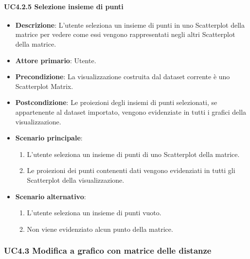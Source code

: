\paragraph{UC4.2.5 Selezione insieme di punti}
\label{par:uc4.2.5}
\begin{itemize}
    \item \textbf{Descrizione}: L'utente seleziona un insieme di punti in uno Scatterplot della matrice per vedere come 
                                essi vengono rappresentati negli altri Scatterplot della matrice.
	
    \item \textbf{Attore primario}: Utente.
    
    \item \textbf{Precondizione}:   La visualizzazione costruita dal dataset corrente è uno Scatterplot Matrix.
    \item \textbf{Postcondizione}:  Le proiezioni degli insiemi di punti selezionati, se appartenente al dataset importato, 
                                    vengono evidenziate in tutti i grafici della visualizzazione.

	\item \textbf{Scenario principale}:
        \begin{enumerate}
            \item L'utente seleziona un insieme di punti di uno Scatterplot della matrice.
            \item Le proiezioni dei punti contenenti dati vengono evidenziati in tutti gli Scatterplot della visualizzazione.
        \end{enumerate}

    \item \textbf{Scenario alternativo}:
        \begin{enumerate}
            \item L'utente seleziona un insieme di punti vuoto.
            \item Non viene evidenziato alcun punto della matrice.
        \end{enumerate}

\end{itemize}

\newpage
\subsubsection{UC4.3 Modifica a grafico con matrice delle distanze}
\label{ssub:uc4.3}

